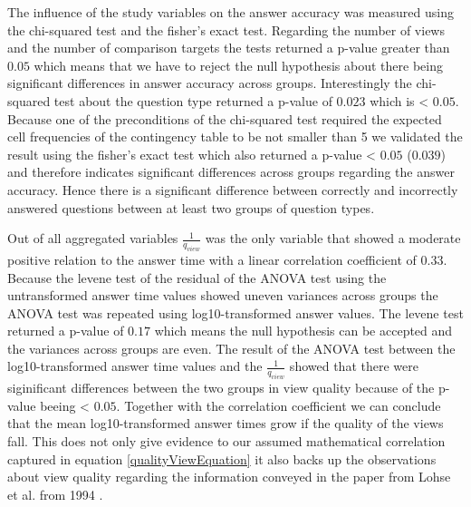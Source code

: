 The influence of the study variables on the answer accuracy was measured using the chi-squared test and the fisher's exact test. Regarding the
number of views and the number of comparison targets the tests returned a p-value greater than $0.05$ which means
that we have to reject the null hypothesis about there being significant differences in answer accuracy across groups. Interestingly the
chi-squared test about the question type returned a p-value of $0.023$ which is < $0.05$. Because one of the preconditions of the chi-squared test
required the expected cell frequencies of the contingency table to be not smaller than 5 we validated the result using the fisher's exact test which also
returned a p-value < $0.05$ ($0.039$) and therefore indicates significant differences across groups regarding the answer accuracy. Hence there is a significant
difference between correctly and incorrectly answered questions between at least two groups of question types.

Out of all aggregated variables $\frac{1}{q_{view}}$ was the only variable that showed a moderate positive relation to the answer time with a linear correlation coefficient of $0.33$.
Because the levene test of the residual of the ANOVA test using the untransformed answer time values showed uneven variances across groups the ANOVA test was repeated
using log10-transformed answer values. The levene test returned a p-value of $0.17$ which means the null hypothesis can be accepted and the variances across groups are even.
The result of the ANOVA test between the log10-transformed answer time values and the $\frac{1}{q_{view}}$ showed that there were siginificant differences between
the two groups in view quality because of the p-value beeing < $0.05$. Together with the correlation coefficient we can conclude that the mean log10-transformed answer times
grow if the quality of the views fall. This does not only give evidence to our assumed mathematical correlation captured in equation \ref{qualityViewEquation} it also backs up
the observations about view quality regarding the information conveyed in the paper from Lohse et al. from 1994 \citep{Lohse.1994}.


